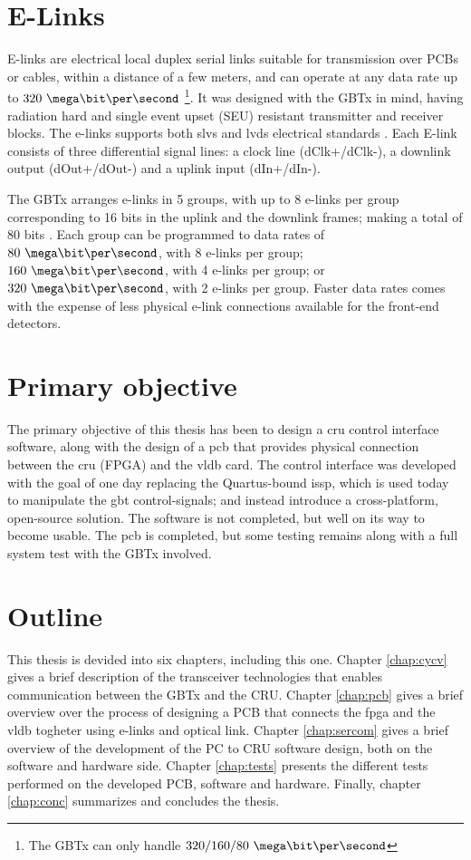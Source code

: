 \documentclass[main.tex]{subfiles}
\begin{document}
\section{E-Links} \label{sec:elinks}
E-links are electrical local duplex  serial links suitable for transmission over PCBs or cables, within a distance of a few meters, and can operate at any data rate up to $320~\mega\bit\per\second$ \footnote{The GBTx can only handle $320/160/80~\mega\bit\per\second$}. It was designed with the GBTx in mind, having radiation hard and single event upset (SEU) resistant transmitter and receiver blocks. The e-links supports both \acrshort{slvs} and \acrshort{lvds} electrical standards \cite{elinks}. Each E-link consists of three differential signal lines: a clock line (dClk+/dClk-), a downlink output (dOut+/dOut-) and a uplink input (dIn+/dIn-).

The GBTx arranges e-links in 5 groups, with up to 8 e-links per group corresponding to 16 bits in the uplink and the downlink frames; making a total of 80 bits \cite{gbtxman11}. Each group can be programmed to data rates of $80~\mega\bit\per\second$, with 8 e-links per group; $160~\mega\bit\per\second$, with 4 e-links per group; or $320~\mega\bit\per\second$, with 2 e-links per group. Faster data rates comes with the expense of less physical e-link connections available for the front-end detectors.

\section{Primary objective}
The primary objective of this thesis has been to design a \gls{cru} control interface software, along with the design of a \gls{pcb} that provides physical connection between the \gls{cru} (FPGA) and the \gls{vldb} card. The control interface was developed with the goal of one day replacing the Quartus-bound \gls{issp}, which is used today to manipulate the \gls{gbt} control-signals; and instead introduce a cross-platform, open-source solution. The software is not completed, but well on its way to become usable. The \gls{pcb} is completed, but some testing remains along with a full system test with the GBTx involved.

\section{Outline}
This thesis is devided into six chapters, including this one. Chapter \ref{chap:cycv} gives a brief description of the transceiver technologies that enables communication between the GBTx and the CRU. Chapter \ref{chap:pcb} gives a brief overview over the process of designing a PCB that connects the \gls{fpga} and the \gls{vldb} togheter using e-links and optical link. Chapter \ref{chap:sercom} gives a brief overview of the development of the PC to CRU software design, both on the software and hardware side. Chapter \ref{chap:tests} presents the different tests performed on the developed PCB, software and hardware. Finally, chapter \ref{chap:conc} summarizes and concludes the thesis.
\end{document}
